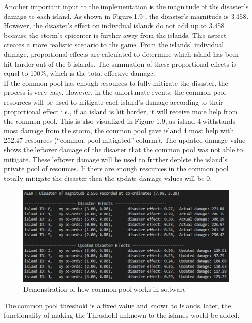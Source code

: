Another important input to the implementation is the magnitude of the disaster’s damage to each island. As shown in Figure 1.9 , the disaster’s magnitude is 3.458. However, the disaster’s effect on individual islands do not add up to 3.458 because the storm’s epicenter is further away from the islands. This aspect creates a more realistic scenario to the game. From the islands’ individual damage, proportional effects are calculated to determine which island has been hit harder out of the 6 islands. The summation of these proportional effects is equal to 100\%, which is the total effective damage. \\

If the common pool has enough resources to fully mitigate the disaster, the process is very easy. However, in the unfortunate events, the common pool resources will be used to mitigate each island's damage according to their proportional effect i.e., if an island is hit harder, it will receive more help from the common pool. This is also visualized in Figure 1.9, as island 4 withstands most damage from the storm, the common pool gave island 4 most help with 252.47 resources (“common pool mitigated” column). The updated damage value shows the leftover damage of the disaster that the common pool was not able to mitigate. These leftover damage will be used to further deplete the island's private pool of resources. If there are enough resources in the common pool totally mitigate the disaster then the update damage values will be 0.\\

\begin{figure}[!htb]
    \centering
    \includegraphics[width=1\textwidth]{04_environment/Images/Common Pool infrastructure outcome.PNG}
    \caption{Demonstration of how common pool works in software}
    \label{Images:Common Pool infrastructure outcome}
\end{figure}

The common pool threshold is a fixed value and known to islands. later, the functionality of making the Threshold unknown to the islands would be added. \\

